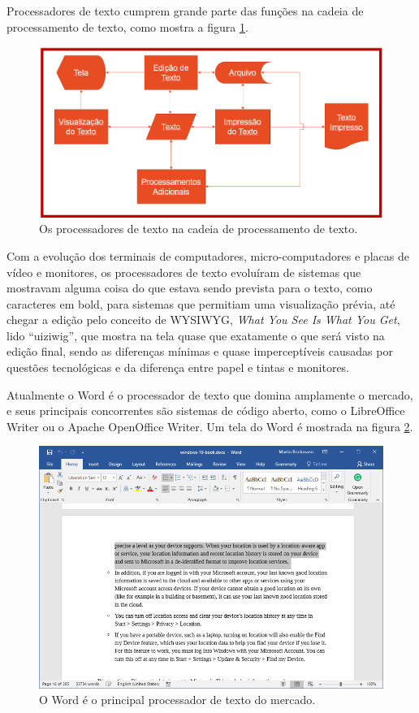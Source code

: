 Processadores de texto cumprem grande parte das funções na cadeia de processamento de texto, como mostra a figura \ref{fig:processador}.

\begin{figure}[hbt]
    \centering
    \includegraphics[width=0.7\linewidth]{Images/processador}
    \caption[Os processadores de texto]{Os processadores de texto na cadeia de processamento de texto.}
    \label{fig:processador}
\end{figure}

Com a evolução dos terminais de computadores, micro-computadores e placas de vídeo e monitores, os processadores de texto evoluíram de sistemas que mostravam alguma coisa do que estava sendo prevista para o texto, como caracteres em bold, para sistemas que permitiam uma visualização prévia, até chegar a edição pelo conceito de WYSIWYG, \textit{What You See Is What You Get}, lido \enquote{uiziwig},  que mostra na tela quase que exatamente o que será visto na edição final, sendo as diferenças mínimas e quase imperceptíveis causadas por questões tecnológicas e da diferença entre papel e tintas e monitores.


Atualmente o Word é o processador de texto que domina amplamente o mercado, e seus principais concorrentes são sistemas de código aberto, como o LibreOffice Writer ou o Apache OpenOffice Writer. Um tela do Word é mostrada na figura \ref{fig:word}.

\begin{figure}[hbt]
    \centering
    \includegraphics[width=0.7\linewidth]{Images/word}
    \caption[O Word]{O Word é o principal processador de texto do mercado.}
    \label{fig:word}
\end{figure}

